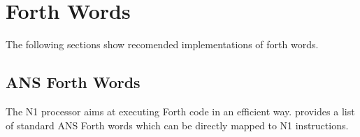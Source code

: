 
\section{Forth Words}
\label{words}

The following sections show recomended implementations of \gls{forth} words. 


\subsection{ANS Forth Words}
\label{words:ans}

The N1 processor aims at executing Forth code in an efficient way.
 provides a list of standard ANS Forth\cite{dpans94} words 
which can be directly mapped to N1 instructions. 

